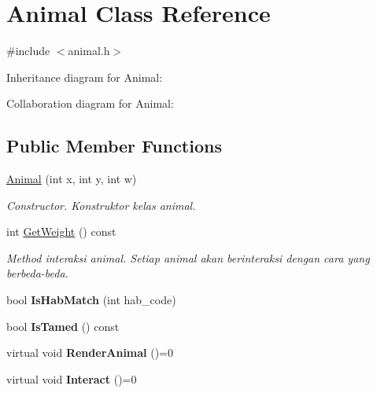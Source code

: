\hypertarget{classAnimal}{}\section{Animal Class Reference}
\label{classAnimal}


{\ttfamily \#include $<$animal.\+h$>$}



Inheritance diagram for Animal\+:


Collaboration diagram for Animal\+:
\subsection*{Public Member Functions}
\begin{DoxyCompactItemize}
\item 
\hyperlink{classAnimal_a38f8dc7a0844d03658f0cd5de482a5db}{Animal} (int x, int y, int w)\hypertarget{classAnimal_a38f8dc7a0844d03658f0cd5de482a5db}{}\label{classAnimal_a38f8dc7a0844d03658f0cd5de482a5db}

\begin{DoxyCompactList}\small\item\em Constructor. Konstruktor kelas animal. \end{DoxyCompactList}\item 
int \hyperlink{classAnimal_a5d8a5a5c881f46e0de6438f902eb57ee}{Get\+Weight} () const \hypertarget{classAnimal_a5d8a5a5c881f46e0de6438f902eb57ee}{}\label{classAnimal_a5d8a5a5c881f46e0de6438f902eb57ee}

\begin{DoxyCompactList}\small\item\em Method interaksi animal. Setiap animal akan berinteraksi dengan cara yang berbeda-\/beda. \end{DoxyCompactList}\item 
bool {\bfseries Is\+Hab\+Match} (int hab\+\_\+code)\hypertarget{classAnimal_af36015d1c2001418ce0efc28c64023f5}{}\label{classAnimal_af36015d1c2001418ce0efc28c64023f5}

\item 
bool {\bfseries Is\+Tamed} () const \hypertarget{classAnimal_a7a125f380393ab6be7eb26c93613bc3c}{}\label{classAnimal_a7a125f380393ab6be7eb26c93613bc3c}

\item 
virtual void {\bfseries Render\+Animal} ()=0\hypertarget{classAnimal_ac27914cf89bb7de9785e74845e34828a}{}\label{classAnimal_ac27914cf89bb7de9785e74845e34828a}

\item 
virtual void {\bfseries Interact} ()=0\hypertarget{classAnimal_aa620e55ec419fc9b20d983d933b5ee11}{}\label{classAnimal_aa620e55ec419fc9b20d983d933b5ee11}

\end{DoxyCompactItemize}
